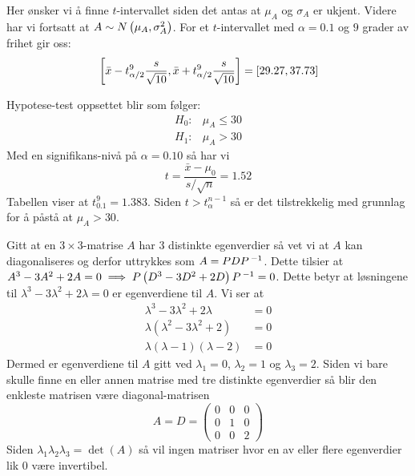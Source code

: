 \deloppgave
Her ønsker vi å finne $t$-intervallet siden det antas at $\mu_A$ og $\sigma_A$ er ukjent. Videre har vi fortsatt at $A\sim N\left(\mu_A, \sigma_A^2\right)$. For et $t$-intervallet med $\alpha = 0.1$ og $9$ grader av frihet gir oss:
$$
\,\left[\bar{x} - t^9_{\alpha/2} \frac{s}{\sqrt{10}}, \bar{x} + t^9_{\alpha/2} \frac{s}{\sqrt{10}}\right] = \left[29.27, 37.73\right]
$$

\deloppgave
Hypotese-test oppsettet blir som følger:
\begin{align*}
	H_0\colon & \mu_A \leq 30\\
	H_1\colon & \mu_A > 30
\end{align*}
Med en signifikans-nivå på $\alpha = 0.10$ så har vi
$$
t = \frac{\bar{x} - \mu_0}{s/\sqrt{n}} = 1.52
$$
Tabellen viser at $t_{0.1}^9 = 1.383$. Siden $t > t_{\alpha}^{n-1}$ så er det tilstrekkelig med grunnlag for å påstå at $\mu_A > 30$.

\oppgave
Gitt at en $3\times 3$-matrise $A$ har $3$ distinkte egenverdier så vet vi at $A$ kan diagonaliseres og derfor uttrykkes som $A = PDP\,^{-1}$. Dette tilsier at $A^3 -3A^2 + 2A = 0 \implies P\left(D^3 - 3D^2 + 2D\right)P\,^{-1} = 0$. Dette betyr at løsningene til $\lambda^3 - 3\lambda^2 + 2\lambda = 0$ er egenverdiene til $A$. Vi ser at
\begin{align*}
	\lambda^3 - 3\lambda^2 + 2\lambda &= 0\\
	\lambda(\lambda^2 - 3\lambda^2 + 2) &= 0\\
	\lambda(\lambda - 1)(\lambda - 2) &= 0
\end{align*}
Dermed er egenverdiene til $A$ gitt ved $\lambda_1 = 0$, $\lambda_2 = 1$ og $\lambda_3 = 2$. Siden vi bare skulle finne en eller annen matrise med tre distinkte egenverdier så blir den enkleste matrisen være diagonal-matrisen
$$
A = D = \begin{pmatrix}
	0 & 0 & 0\\
	0 & 1 & 0\\
	0 & 0 & 2
\end{pmatrix}
$$
Siden $\lambda_1\lambda_2\lambda_3 = \det(A)$ så vil ingen matriser hvor en av eller flere egenverdier lik $0$ være invertibel.

